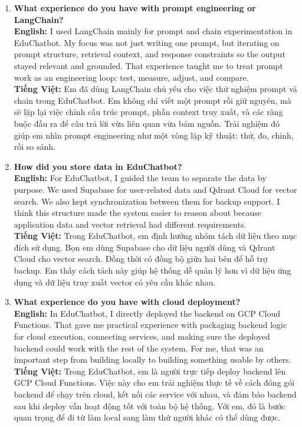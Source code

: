 \documentclass[11pt,a4paper]{article}
\begin{document}
\begin{enumerate}[leftmargin=*, itemsep=10pt]
\item \textbf{What experience do you have with prompt engineering or LangChain?}\\
\textbf{English:} I used LangChain mainly for prompt and chain experimentation in EduChatbot. My focus was not just writing one prompt, but iterating on prompt structure, retrieval context, and response constraints so the output stayed relevant and grounded. That experience taught me to treat prompt work as an engineering loop: test, measure, adjust, and compare.\\
\textbf{Tiếng Việt:} Em đã dùng LangChain chủ yếu cho việc thử nghiệm prompt và chain trong EduChatbot. Em không chỉ viết một prompt rồi giữ nguyên, mà sẽ lặp lại việc chỉnh cấu trúc prompt, phần context truy xuất, và các ràng buộc đầu ra để câu trả lời vừa liên quan vừa bám nguồn. Trải nghiệm đó giúp em nhìn prompt engineering như một vòng lặp kỹ thuật: thử, đo, chỉnh, rồi so sánh.

\item \textbf{How did you store data in EduChatbot?}\\
\textbf{English:} For EduChatbot, I guided the team to separate the data by purpose. We used Supabase for user-related data and Qdrant Cloud for vector search. We also kept synchronization between them for backup support. I think this structure made the system easier to reason about because application data and vector retrieval had different requirements.\\
\textbf{Tiếng Việt:} Trong EduChatbot, em định hướng nhóm tách dữ liệu theo mục đích sử dụng. Bọn em dùng Supabase cho dữ liệu người dùng và Qdrant Cloud cho vector search. Đồng thời có đồng bộ giữa hai bên để hỗ trợ backup. Em thấy cách tách này giúp hệ thống dễ quản lý hơn vì dữ liệu ứng dụng và dữ liệu truy xuất vector có yêu cầu khác nhau.

\item \textbf{What experience do you have with cloud deployment?}\\
\textbf{English:} In EduChatbot, I directly deployed the backend on GCP Cloud Functions. That gave me practical experience with packaging backend logic for cloud execution, connecting services, and making sure the deployed backend could work with the rest of the system. For me, that was an important step from building locally to building something usable by others.\\
\textbf{Tiếng Việt:} Trong EduChatbot, em là người trực tiếp deploy backend lên GCP Cloud Functions. Việc này cho em trải nghiệm thực tế về cách đóng gói backend để chạy trên cloud, kết nối các service với nhau, và đảm bảo backend sau khi deploy vẫn hoạt động tốt với toàn bộ hệ thống. Với em, đó là bước quan trọng để đi từ làm local sang làm thứ người khác có thể dùng được.


\end{enumerate}
\end{document}

